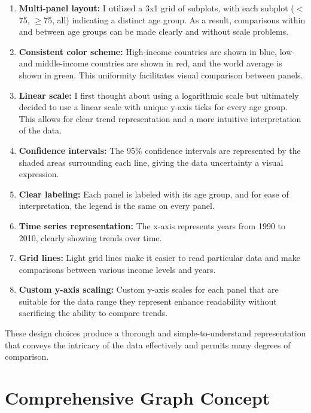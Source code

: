 \documentclass[a4paper]{article}
\begin{document}
\begin{enumerate}
    \item \textbf{Multi-panel layout:} I utilized a 3x1 grid of subplots, with each subplot ($<$75, $\geq$75, all) indicating a distinct age group. As a result, comparisons within and between age groups can be made clearly and without scale problems.

    \item \textbf{Consistent color scheme:} High-income countries are shown in blue, low- and middle-income countries are shown in red, and the world average is shown in green. This uniformity facilitates visual comparison between panels.

    \item \textbf{Linear scale:} I first thought about using a logarithmic scale but ultimately decided to use a linear scale with unique y-axis ticks for every age group. This allows for clear trend representation and a more intuitive interpretation of the data.

    \item \textbf{Confidence intervals:} The 95\% confidence intervals are represented by the shaded areas surrounding each line, giving the data uncertainty a visual expression.

    \item \textbf{Clear labeling:} Each panel is labeled with its age group, and for ease of interpretation, the legend is the same on every panel.

    \item \textbf{Time series representation:} The x-axis represents years from 1990 to 2010, clearly showing trends over time.

    \item \textbf{Grid lines:} Light grid lines make it easier to read particular data and make comparisons between various income levels and years.

    \item \textbf{Custom y-axis scaling:} Custom y-axis scales for each panel that are suitable for the data range they represent enhance readability without sacrificing the ability to compare trends.
\end{enumerate}

These design choices produce a thorough and simple-to-understand representation that conveys the intricacy of the data effectively and permits many degrees of comparison.

\section{Comprehensive Graph Concept}
\end{document}
